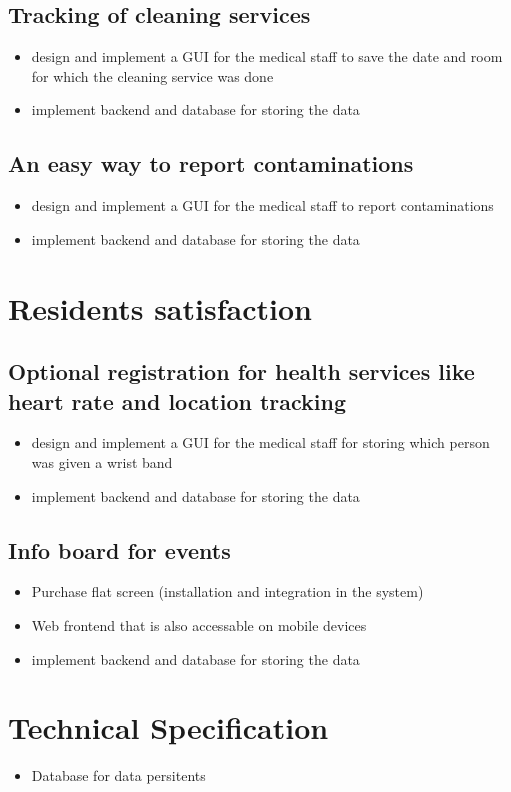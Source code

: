\documentclass
[
 12pt, %
       DIV12,
       a4paper, %
       oneside, %
       titlepage, %
       parskip=half, %
       headings=normal, %
       listof=totoc, %
       bibliography=totoc, %
       index=totoc, %
       captions=tableheading, %
       ]{scrreprt}
\begin{document}
\section{Tracking of cleaning services}
\label{sec:orgf9a4e45}
\begin{itemize}
\item design and implement a GUI for the medical staff to save the date and room for which the cleaning service was done
\item implement backend and database for storing the data
\end{itemize}
\section{An easy way to report contaminations}
\label{sec:orgb90ba73}
\begin{itemize}
\item design and implement a GUI for the medical staff to report contaminations
\item implement backend and database for storing the data
\end{itemize}
\chapter{Residents satisfaction}
\label{sec:org01d99e4}
\section{Optional registration for health services like heart rate and location tracking}
\label{sec:org6e3ace2}
\begin{itemize}
\item design and implement a GUI for the medical staff for storing which person was given a wrist band
\item implement backend and database for storing the data
\end{itemize}
\section{Info board for events}
\label{sec:orgd5f5818}
\begin{itemize}
\item Purchase flat screen (installation and integration in the system)
\item Web frontend that is also accessable on mobile devices
\item implement backend and database for storing the data
\end{itemize}


\chapter{Technical Specification}
\label{sec:org2777fd5}
\begin{itemize}
\item Database for data persitents
\end{itemize}
\end{document}
